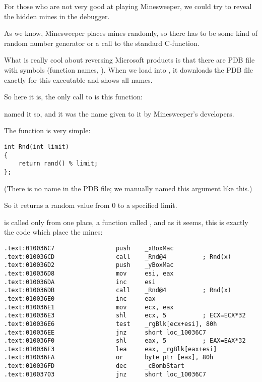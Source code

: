 \mysection{\MinesweeperWinXPExampleChapterName}
\label{minesweeper_winxp}

For those who are not very good at playing Minesweeper, we could try to reveal the hidden mines in the debugger.


As we know, Minesweeper places mines randomly, so there has to be some kind of random number generator or
a call to the standard  C-function.

What is really cool about reversing Microsoft products is that there are \gls{PDB} 
file with symbols (function names, \etc{}).
When we load  into \IDA, it downloads the 
\gls{PDB} file exactly for this 
executable and shows all names.

So here it is, the only call to  is this function:



\IDA named it so, and it was the name given to it by Minesweeper's developers.

The function is very simple:

\begin{lstlisting}[style=customc]
int Rnd(int limit)
{
    return rand() % limit;
};
\end{lstlisting}

(There is no  name in the \gls{PDB} file; we manually named this argument like this.)

So it returns 
a random value from 0 to a specified limit.

 is called only from one place, 
a function called , 
and as it seems, this is exactly 
the code which place the mines:

\begin{lstlisting}[style=customasmx86]
.text:010036C7                 push    _xBoxMac
.text:010036CD                 call    _Rnd@4          ; Rnd(x)
.text:010036D2                 push    _yBoxMac
.text:010036D8                 mov     esi, eax
.text:010036DA                 inc     esi
.text:010036DB                 call    _Rnd@4          ; Rnd(x)
.text:010036E0                 inc     eax
.text:010036E1                 mov     ecx, eax
.text:010036E3                 shl     ecx, 5          ; ECX=ECX*32
.text:010036E6                 test    _rgBlk[ecx+esi], 80h
.text:010036EE                 jnz     short loc_10036C7
.text:010036F0                 shl     eax, 5          ; EAX=EAX*32
.text:010036F3                 lea     eax, _rgBlk[eax+esi]
.text:010036FA                 or      byte ptr [eax], 80h
.text:010036FD                 dec     _cBombStart
.text:01003703                 jnz     short loc_10036C7
\end{lstlisting}

